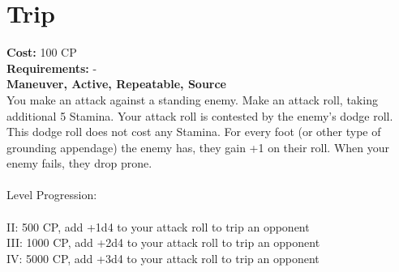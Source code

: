 \section{Trip}
\textbf{Cost:} 100 CP\\
\textbf{Requirements:} -\\
\textbf{Maneuver, Active, Repeatable, Source}\\
You make an attack against a standing enemy. Make an attack roll, taking additional 5 Stamina. Your attack roll is contested by the enemy's dodge roll. This dodge roll does not cost any Stamina. For every foot (or other type of grounding appendage) the enemy has, they gain +1 on their roll. When your enemy fails, they drop prone. \\
\\
Level Progression:\\
\\
II: 500 CP, add +1d4 to your attack roll to trip an opponent\\
III: 1000 CP, add +2d4 to your attack roll to trip an opponent\\
IV: 5000 CP, add +3d4 to your attack roll to trip an opponent\\